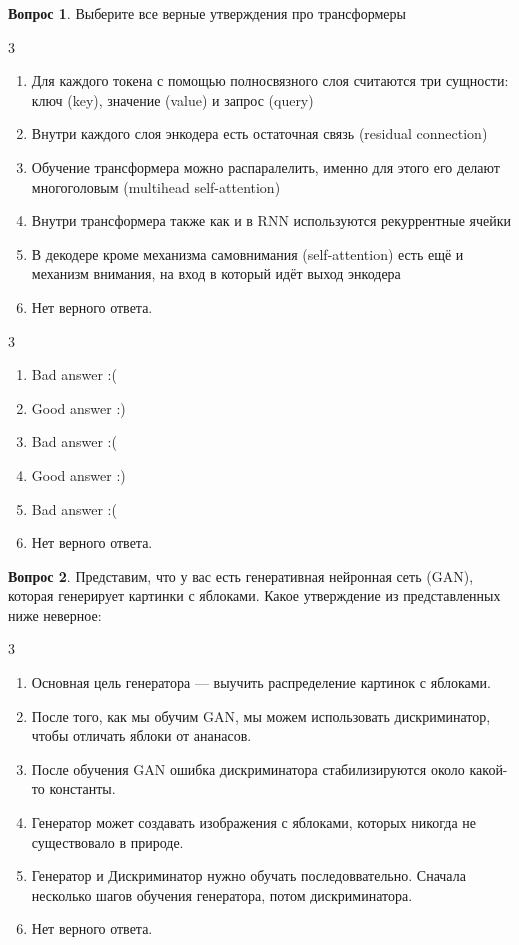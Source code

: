 \documentclass[12pt]{article}
\newenvironment{answerlist}[1][3]{
\begin{multicols}{#1}

\begin{enumerate}[label=\fbox{\emph{\Alph*}},ref=\emph{\alph*}]
}
{
\item Нет верного ответа.
\end{enumerate}
\end{multicols}
}
\theoremstyle{definition}
\newtheorem{question}{Вопрос}
\begin{document}
\newpage

\begin{question}
Выберите все верные утверждения про трансформеры
\begin{answerlist}
  \item Для каждого токена с помощью полносвязного слоя считаются три сущности: ключ (key), значение (value) и запрос (query)
  \item Внутри каждого слоя энкодера есть остаточная связь (residual connection)
  \item Обучение трансформера можно распаралелить, именно для этого его делают многоголовым (multihead self-attention)
  \item Внутри трансформера также как и в RNN используются рекуррентные ячейки
  \item В декодере кроме механизма самовнимания (self-attention) есть ещё и механизм внимания, на вход в который идёт выход энкодера
\end{answerlist}
\end{question}

\begin{solution}
\begin{answerlist}
  \item Bad answer :(
  \item Good answer :)
  \item Bad answer :(
  \item Good answer :)
  \item Bad answer :(
\end{answerlist}
\end{solution}


\begin{question}
    Представим, что у вас есть генеративная нейронная сеть (GAN), которая генерирует картинки с яблоками. Какое утверждение из представленных ниже неверное:
    \begin{answerlist}
      \item Основная цель генератора --- выучить распределение картинок с яблоками.
      \item После того, как мы обучим GAN, мы можем использовать дискриминатор, чтобы отличать яблоки от ананасов. 
      \item После обучения GAN ошибка дискриминатора стабилизируются около какой-то константы. 
      \item Генератор может создавать изображения с яблоками, которых никогда не существовало в природе. 
      \item Генератор и Дискриминатор нужно обучать последоввательно. Сначала несколько шагов обучения генератора, потом дискриминатора.
    \end{answerlist}
\end{question}
\end{document}
